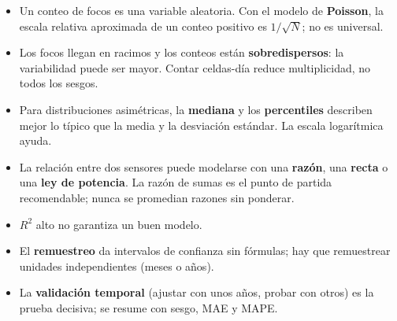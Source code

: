\begin{itemize}
  \item Un conteo de focos es una variable aleatoria. Con el modelo de \textbf{Poisson}, la
  escala relativa aproximada de un conteo positivo es $1/\sqrt{N}$; no es universal.
  \item Los focos llegan en racimos y los conteos están \textbf{sobredispersos}: la
  variabilidad puede ser mayor. Contar celdas-día reduce multiplicidad, no todos los sesgos.
  \item Para distribuciones asimétricas, la \textbf{mediana} y los \textbf{percentiles}
  describen mejor lo típico que la media y la desviación estándar. La escala logarítmica ayuda.
  \item La relación entre dos sensores puede modelarse con una \textbf{razón}, una
  \textbf{recta} o una \textbf{ley de potencia}. La razón de sumas es el punto de partida
  recomendable; nunca se promedian razones sin ponderar.
  \item $R^2$ alto no garantiza un buen modelo.
  \item El \textbf{remuestreo} da intervalos de confianza sin fórmulas; hay que remuestrear
  unidades independientes (meses o años).
  \item La \textbf{validación temporal} (ajustar con unos años, probar con otros) es la prueba
  decisiva; se resume con sesgo, MAE y MAPE.
\end{itemize}

\ejercicios

